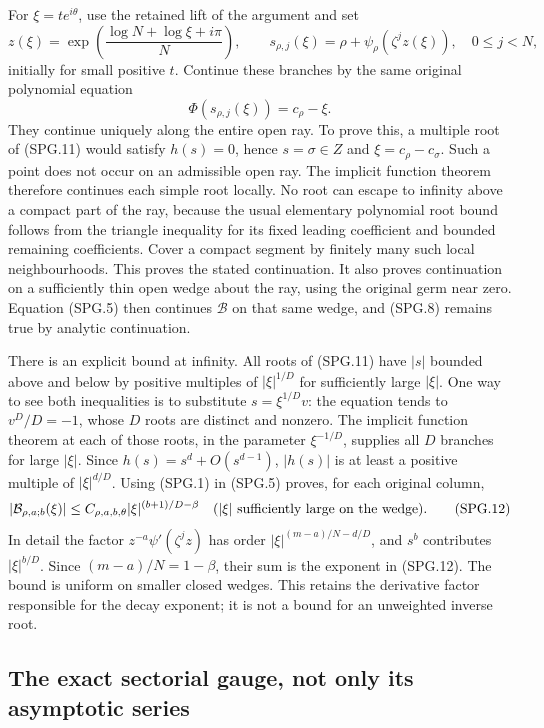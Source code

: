 For \(\xi=t e^{i\theta}\), use the retained lift of the argument
and set
\[
 z(\xi)=\exp\left(\frac{\log N+\log\xi+i\pi}{N}\right),
 \qquad s_{\rho,j}(\xi)=\rho+\psi_\rho(\zeta^jz(\xi)),
 \quad 0\le j<N,
 \tag{SPG.10}\label{GraphV2:eq:spg-lifts}
\]
initially for small positive \(t\). Continue these branches by the
same original polynomial equation
\[
 \Phi(s_{\rho,j}(\xi))=c_\rho-\xi.
 \tag{SPG.11}\label{GraphV2:eq:spg-inverse-polynomial}
\]
They continue uniquely along the entire open ray. To prove this, a
multiple root of (SPG.11) would satisfy \(h(s)=0\), hence
\(s=\sigma\in Z\) and \(\xi=c_\rho-c_\sigma\). Such a point
does not occur on an admissible open ray. The implicit function
theorem therefore continues each simple root locally. No root can
escape to infinity above a compact part of the ray, because the
usual elementary polynomial root bound follows from the triangle
inequality for its fixed leading coefficient and bounded remaining
coefficients. Cover a compact segment by finitely many such local
neighbourhoods. This proves the stated continuation. It also proves
continuation on a sufficiently thin open wedge about the ray, using
the original germ near zero. Equation (SPG.5) then continues
\(\mathcal B\) on that same wedge, and (SPG.8) remains true by
analytic continuation.

There is an explicit bound at infinity. All roots of (SPG.11) have
\(|s|\) bounded above and below by positive multiples of
\(|\xi|^{1/D}\) for sufficiently large \(|\xi|\). One way to
see both inequalities is to substitute \(s=\xi^{1/D}v\): the
equation tends to \(v^D/D=-1\), whose \(D\) roots are distinct
and nonzero. The implicit function theorem at each of those roots,
in the parameter \(\xi^{-1/D}\), supplies all \(D\) branches
for large \(|\xi|\). Since \(h(s)=s^d+O(s^{d-1})\),
\(|h(s)|\) is at least a positive multiple of \(|\xi|^{d/D}\).
Using (SPG.1) in (SPG.5) proves, for each original column,
\[
 |\mathcal B_{\rho,a;b}(\xi)|
       \le C_{\rho,a,b,\theta}
                   |\xi|^{(b+1)/D-\beta}
       \quad (|\xi|\hbox{ sufficiently large on the wedge}).
 \tag{SPG.12}\label{GraphV2:eq:spg-infinity}
\]
In detail the factor \(z^{-a}\psi'(\zeta^jz)\) has order
\(|\xi|^{(m-a)/N-d/D}\), and \(s^b\) contributes
\(|\xi|^{b/D}\). Since \((m-a)/N=1-\beta\), their sum is
the exponent in (SPG.12). The bound is uniform on smaller closed
wedges. This retains the derivative factor responsible for the
decay exponent; it is not a bound for an unweighted inverse root.

\subsection{The exact sectorial gauge, not only its asymptotic series}

